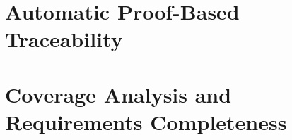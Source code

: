 \section{Automatic Proof-Based Traceability}
\label{sec:traceability}


\section{Coverage Analysis and Requirements Completeness}






